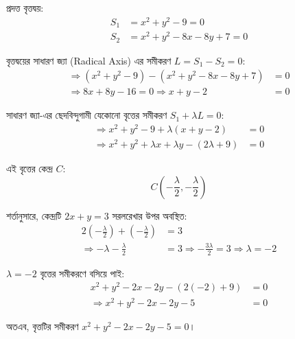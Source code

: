 \documentclass[12pt, a4paper]{article}
\begin{document}
\begin{tcolorbox}[solutionbox={সমাধান (Solution)}]
    \noindent
    প্রদত্ত বৃত্তদ্বয়: 
    \begin{align*}
        S_1 &= x^2 + y^2 - 9 = 0 \\
        S_2 &= x^2 + y^2 - 8x - 8y + 7 = 0
    \end{align*}
    
    \vspace{0.5em}
    বৃত্তদ্বয়ের সাধারণ জ্যা (Radical Axis) এর সমীকরণ $L = S_1 - S_2 = 0$:
    \begin{align*}
        \Rightarrow (x^2 + y^2 - 9) - (x^2 + y^2 - 8x - 8y + 7) &= 0 \\
        \Rightarrow 8x + 8y - 16 = 0 \Rightarrow x + y - 2 &= 0
    \end{align*}
    
    \vspace{0.5em}
    সাধারণ জ্যা-এর ছেদবিন্দুগামী যেকোনো বৃত্তের সমীকরণ $S_1 + \lambda L = 0$:
    \begin{align*}
        \Rightarrow x^2 + y^2 - 9 + \lambda(x + y - 2) &= 0 \\
        \Rightarrow x^2 + y^2 + \lambda x + \lambda y - (2\lambda + 9) &= 0
    \end{align*}
    
    \vspace{0.5em}
    এই বৃত্তের কেন্দ্র $C$:
    \[ C\left(-\frac{\lambda}{2}, -\frac{\lambda}{2}\right) \]
    
    \vspace{0.5em}
    শর্তানুসারে, কেন্দ্রটি $2x + y = 3$ সরলরেখার উপর অবস্থিত:
    \begin{align*}
        2\left(-\frac{\lambda}{2}\right) + \left(-\frac{\lambda}{2}\right) &= 3 \\
        \Rightarrow -\lambda - \frac{\lambda}{2} &= 3 \Rightarrow -\frac{3\lambda}{2} = 3 \Rightarrow \lambda = -2
    \end{align*}
    
    \vspace{0.5em}
    $\lambda = -2$ বৃত্তের সমীকরণে বসিয়ে পাই:
    \begin{align*}
        x^2 + y^2 - 2x - 2y - (2(-2) + 9) &= 0 \\
        \Rightarrow x^2 + y^2 - 2x - 2y - 5 &= 0
    \end{align*}
    
    \vspace{0.5em}
    অতএব, বৃত্তটির সমীকরণ $x^2 + y^2 - 2x - 2y - 5 = 0$।
\end{tcolorbox}
\end{document}
